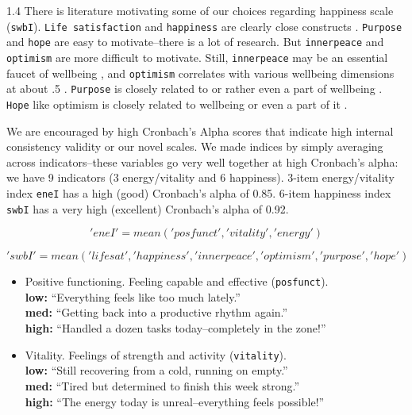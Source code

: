 \documentclass[10pt, letterpaper]{article}
\begin{document}
\begin{spacing}{1.4}
There is literature motivating some of our  choices regarding
happiness scale (\texttt{swbI}). \texttt{Life satisfaction} and \texttt{happiness}
are clearly close constructs
\citep{michalos1980satisfaction,song2023predicting}. \texttt{Purpose} and
\texttt{hope} are easy to motivate--there is a lot of research. But
\texttt{innerpeace} and \texttt{optimism} are more difficult to motivate. Still, 
\texttt{innerpeace} may be an essential faucet of wellbeing
\citep{carreno2021inner}, and  \texttt{optimism} correlates with
various wellbeing dimensions at about .5 \citep{shah2026impact}.
\texttt{Purpose} is closely related to or rather even a part of wellbeing
\citep{ryff08,zika92,smith_ac_aug_1_13,manson15,depauloPT21aug28,ryff89,ryff14}.
\texttt{Hope} like optimism is closely related to wellbeing or even a part of it
\citep{manson19,pleeging21}.

We are encouraged by high Cronbach's Alpha scores that indicate high internal
consistency validity or our novel scales.
We made indices by simply averaging across indicators--these variables go
very well together at high Cronbach's alpha:  we have 9 indicators (3
energy/vitality and 6 happiness). 3-item energy/vitality index \texttt{eneI}
has a high (good) Cronbach's alpha of 0.85.
6-item happiness index \texttt{swbI} has a
very high (excellent) Cronbach's alpha of 0.92. 

\begin{equation}
  'eneI' = mean('posfunct','vitality','energy')
  \label{eq:eneI}
\end{equation}

\begin{equation}
  'swbI' = mean('lifesat','happiness','innerpeace','optimism', 'purpose','hope')
  \label{eq:swbI}
\end{equation}


\begin{itemize}%
\item Positive functioning.  Feeling capable and effective (\texttt{posfunct}).\\
  \textbf{low:} ``Everything feels like too much lately.'' \\
  \textbf{med:} ``Getting back into a productive rhythm again.'' \\
  \textbf{high:} ``Handled a dozen tasks today--completely in the zone!''

\item Vitality. Feelings of strength and activity (\texttt{vitality}).\\
  \textbf{low:} ``Still recovering from a cold, running on empty.'' \\
  \textbf{med:} ``Tired but determined to finish this week strong.'' \\
  \textbf{high:} ``The energy today is unreal--everything feels possible!''


\end{itemize}
\end{spacing}
\end{document}
